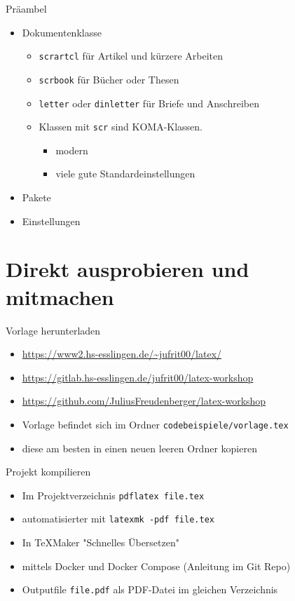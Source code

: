 \documentclass[presentation,aspectratio=169]{beamer}
\begin{document}
\begin{frame}[fragile]{Präambel}
  \begin{itemize}
    \item Dokumentenklasse
      \begin{itemize}
        \item \verb|scrartcl| für Artikel und kürzere Arbeiten
        \item \verb|scrbook| für Bücher oder Thesen
        \item \verb|letter| oder \verb|dinletter| für Briefe und Anschreiben
        \item Klassen mit \verb|scr| sind KOMA-Klassen.
          \begin{itemize}
            \item modern
            \item viele gute Standardeinstellungen
          \end{itemize}
      \end{itemize}
    \item Pakete
    \item Einstellungen
  \end{itemize}
\end{frame}

\section{Direkt ausprobieren und mitmachen}

\begin{frame}[fragile]{Vorlage herunterladen}
  \begin{itemize}
    \item \href{https://www2.hs-esslingen.de/~jufrit00/latex/}{https://www2.hs-esslingen.de/\textasciitilde{}jufrit00/latex/}
    \item \href{https://gitlab.hs-esslingen.de/jufrit00/latex-workshop}{https://gitlab.hs-esslingen.de/jufrit00/latex-workshop}
    \item \href{https://github.com/JuliusFreudenberger/latex-workshop}{https://github.com/JuliusFreudenberger/latex-workshop}
      \bigskip
    \item Vorlage befindet sich im Ordner \verb|codebeispiele/vorlage.tex|
    \item diese am besten in einen neuen leeren Ordner kopieren
  \end{itemize}
\end{frame}

\begin{frame}[fragile]{Projekt kompilieren}
  \begin{itemize}
    \item Im Projektverzeichnis \verb|pdflatex file.tex|
    \item automatisierter mit \verb|latexmk -pdf file.tex|
    \item In \TeX{}Maker "Schnelles Übersetzen"
    \item mittels Docker und Docker Compose (Anleitung im Git Repo)
    \item Outputfile \verb|file.pdf| als PDF-Datei im gleichen Verzeichnis
  \end{itemize}
\end{frame}
\end{document}

